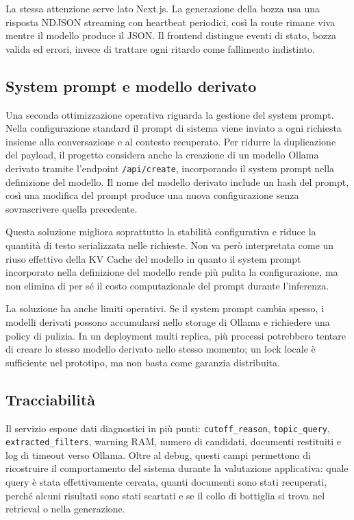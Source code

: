 La stessa attenzione serve lato Next.js. La generazione della bozza usa una
risposta NDJSON streaming con heartbeat periodici, così la route rimane viva
mentre il modello produce il JSON. Il frontend distingue eventi di stato,
bozza valida ed errori, invece di trattare ogni ritardo come fallimento
indistinto.

\subsection{System prompt e modello derivato}
\label{subsec:implementation_prompt_cache}

Una seconda ottimizzazione operativa riguarda la gestione del system prompt.
Nella configurazione standard il prompt di sistema viene inviato a ogni
richiesta insieme alla conversazione e al contesto recuperato. Per ridurre la
duplicazione del payload, il progetto considera anche la creazione di un modello
Ollama derivato tramite l'endpoint \texttt{/api/create}, incorporando il system
prompt nella definizione del modello. Il nome del modello derivato include un
hash del prompt, così una modifica del prompt produce una nuova configurazione
senza sovrascrivere quella precedente.

Questa soluzione migliora soprattutto la stabilità configurativa e riduce la
quantità di testo serializzata nelle richieste. Non va però interpretata come un
riuso effettivo della KV Cache del modello in quanto il system prompt incorporato nella
definizione del modello rende più pulita la configurazione, ma non elimina di
per sé il costo computazionale del prompt durante l'inferenza.

La soluzione ha anche limiti operativi. Se il system prompt cambia spesso, i
modelli derivati possono accumularsi nello storage di Ollama e richiedere una
policy di pulizia. In un deployment multi replica, più processi potrebbero
tentare di creare lo stesso modello derivato nello stesso momento; un lock
locale è sufficiente nel prototipo, ma non basta come garanzia distribuita.

\subsection{Tracciabilità}
\label{subsec:implementation_tracing}

Il servizio espone dati diagnostici in più punti: \texttt{cutoff\_reason},
\texttt{topic\_query}, \texttt{extracted\_filters}, warning RAM, numero di
candidati, documenti restituiti e log di timeout verso Ollama. Oltre al debug,
questi campi permettono di ricostruire il comportamento del sistema durante la
valutazione applicativa: quale query è stata effettivamente cercata, quanti
documenti sono stati recuperati, perché alcuni risultati sono stati scartati e
se il collo di bottiglia si trova nel retrieval o nella generazione.

